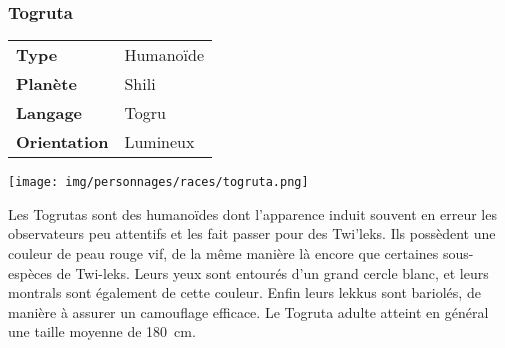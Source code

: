 \subsubsection{Togruta}
\begin{samepage}
	\begin{tabular}{ l l }
		\textbf{Type} 			& Humanoïde \\
	   	\textbf{Planète} 		& Shili \\
	   	\textbf{Langage} 		& Togru \\
	   	\textbf{Orientation} 	& Lumineux \\
	\end{tabular}

	\vspace{-9\baselineskip}
	\begin{flushright}
		\texttt{[image: img/personnages/races/togruta.png]}
	\end{flushright}

	\vspace{-2\baselineskip}
\end{samepage}

Les Togrutas sont des humanoïdes dont l’apparence induit souvent en erreur les observateurs peu attentifs et les fait passer pour des Twi’leks. Ils possèdent une couleur de peau rouge vif, de la même manière là encore que certaines sous-espèces de Twi-leks. Leurs yeux sont entourés d’un grand cercle blanc, et leurs montrals sont également de cette couleur. Enfin leurs lekkus sont bariolés, de manière à assurer un camouflage efficace. Le Togruta adulte atteint en général une taille moyenne de 180~cm. 


